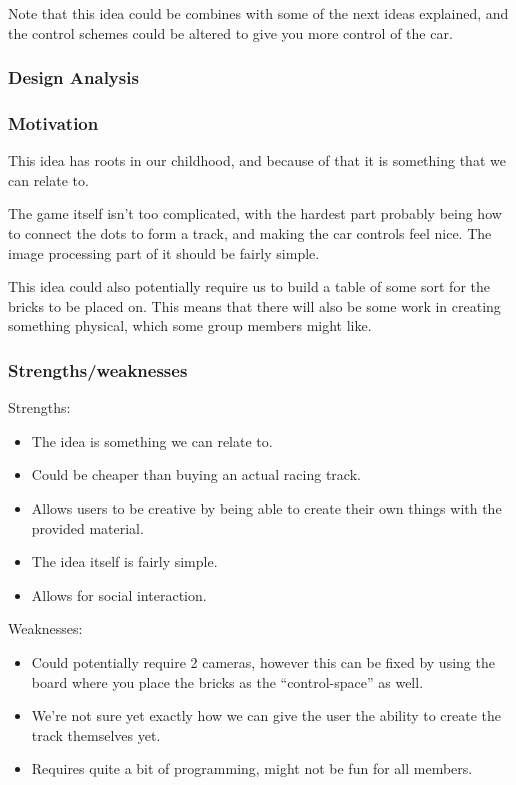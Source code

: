 Note that this idea could be combines with some of the next ideas explained, and the control schemes could be altered to give you more control of the car.

\subsubsection*{Design Analysis}
\subsubsection*{Motivation}
This idea has roots in our childhood, and because of that it is something that we can relate to.
\bigskip

The game itself isn’t too complicated, with the hardest part probably being how to connect the dots to form a track, and making the car controls feel nice. The image processing part of it should be fairly simple.
\bigskip

This idea could also potentially require us to build a table of some sort for the bricks to be placed on. This means that there will also be some work in creating something physical, which some group members might like.

\subsubsection*{Strengths/weaknesses}
Strengths:
\begin{itemize}
\item The idea is something we can relate to.
\item Could be cheaper than buying an actual racing track.
\item Allows users to be creative by being able to create their own things with the provided material.
\item The idea itself is fairly simple.
\item Allows for social interaction.
\end{itemize}
Weaknesses:
\begin{itemize}
\item Could potentially require 2 cameras, however this can be fixed by using the board where you place the bricks as the “control-space” as well.
\item We’re not sure yet exactly how we can give the user the ability to create the track themselves yet.
\item Requires quite a bit of programming, might not be fun for all members.
\end{itemize}

